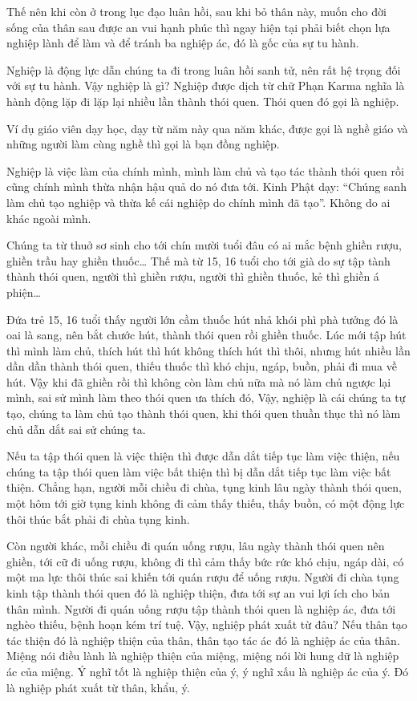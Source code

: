 \documentclass[
  12pt,
  oneside]{book}
\begin{document}
Thế nên khi còn ở trong lục đạo luân hồi, sau khi bỏ thân này, muốn cho đời sống của thân sau được an vui hạnh phúc thì ngay hiện tại phải biết chọn lựa nghiệp lành để làm và để tránh ba nghiệp ác, đó là gốc của sự tu hành.

Nghiệp là động lực dẫn chúng ta đi trong luân hồi sanh tử, nên rất hệ trọng đối với sự tu hành. Vậy nghiệp là gì? Nghiệp được dịch từ chữ Phạn Karma nghĩa là hành động lặp đi lặp lại nhiều lần thành thói quen. Thói quen đó gọi là nghiệp.

Ví dụ giáo viên dạy học, dạy từ năm này qua năm khác, được gọi là nghề giáo và những người làm cùng nghề thì gọi là bạn đồng nghiệp.

Nghiệp là việc làm của chính mình, mình làm chủ và tạo tác thành thói quen rồi cũng chính mình thừa nhận hậu quả do nó đưa tới. Kinh Phật dạy: ``Chúng sanh làm chủ tạo nghiệp và thừa kế cái nghiệp do chính mình đã tạo''. Không do ai khác ngoài mình.

Chúng ta từ thuở sơ sinh cho tới chín mười tuổi đâu có ai mắc bệnh ghiền rượu, ghiền trầu hay ghiền thuốc\ldots{} Thế mà từ 15, 16 tuổi cho tới già do sự tập tành thành thói quen, người thì ghiền rượu, người thì ghiền thuốc, kẻ thì ghiền á phiện\ldots{}

Đứa trẻ 15, 16 tuổi thấy người lớn cầm thuốc hút nhả khói phì phà tưởng đó là oai là sang, nên bắt chước hút, thành thói quen rồi ghiền thuốc. Lúc mới tập hút thì mình làm chủ, thích hút thì hút không thích hút thì thôi, nhưng hút nhiều lần dần dần thành thói quen, thiếu thuốc thì khó chịu, ngáp, buồn, phải đi mua về hút. Vậy khi đã ghiền rồi thì không còn làm chủ nữa mà nó làm chủ ngược lại mình, sai sử mình làm theo thói quen ưa thích đó, Vậy, nghiệp là cái chúng ta tự tạo, chúng ta làm chủ tạo thành thói quen, khi thói quen thuần thục thì nó làm chủ dẫn dắt sai sử chúng ta.

Nếu ta tập thói quen là việc thiện thì được dẫn dắt tiếp tục làm việc thiện, nếu chúng ta tập thói quen làm việc bất thiện thì bị dẫn dắt tiếp tục làm việc bất thiện. Chẳng hạn, người mỗi chiều đi chùa, tụng kinh lâu ngày thành thói quen, một hôm tới giờ tụng kinh không đi cảm thấy thiếu, thấy buồn, có một động lực thôi thúc bắt phải đi chùa tụng kinh.

Còn người khác, mỗi chiều đi quán uống rượu, lâu ngày thành thói quen nên ghiền, tới cữ đi uống rượu, không đi thì cảm thấy bức rức khó chịu, ngáp dài, có một ma lực thôi thúc sai khiến tới quán rượu để uống rượu. Người đi chùa tụng kinh tập thành thói quen đó là nghiệp thiện, đưa tới sự an vui lợi ích cho bản thân mình. Người đi quán uống rượu tập thành thói quen là nghiệp ác, đưa tới nghèo thiếu, bệnh hoạn kém trí tuệ. Vậy, nghiệp phát xuất từ đâu? Nếu thân tạo tác thiện đó là nghiệp thiện của thân, thân tạo tác ác đó là nghiệp ác của thân. Miệng nói điều lành là nghiệp thiện của miệng, miệng nói lời hung dữ là nghiệp ác của miệng. Ý nghĩ tốt là nghiệp thiện của ý, ý nghĩ xấu là nghiệp ác của ý. Đó là nghiệp phát xuất từ thân, khẩu, ý.
\end{document}
